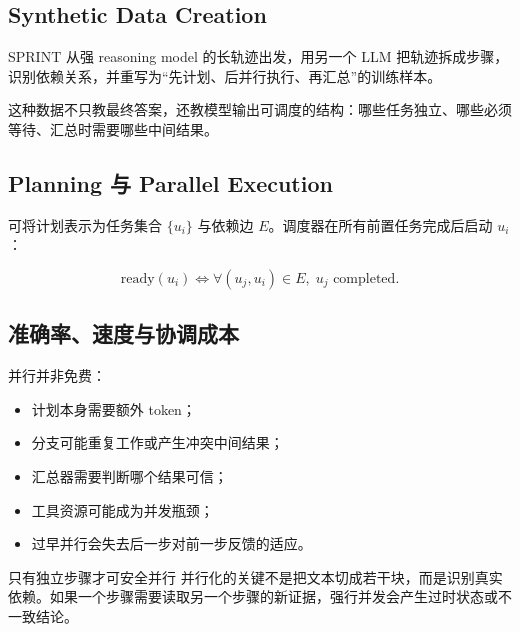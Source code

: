 \documentclass[a4paper]{article}
\begin{document}
\subsection{Synthetic Data Creation}

SPRINT 从强 reasoning model 的长轨迹出发，用另一个 LLM 把轨迹拆成步骤，识别依赖关系，并重写为“先计划、后并行执行、再汇总”的训练样本。


这种数据不只教最终答案，还教模型输出可调度的结构：哪些任务独立、哪些必须等待、汇总时需要哪些中间结果。

\subsection{Planning 与 Parallel Execution}


可将计划表示为任务集合 $\{u_i\}$ 与依赖边 $E$。调度器在所有前置任务完成后启动 $u_i$：

$$
\mathrm{ready}(u_i)\iff \forall (u_j,u_i)\in E,\;u_j\text{ completed}.
$$


\subsection{准确率、速度与协调成本}

并行并非免费：

\begin{itemize}
    \item 计划本身需要额外 token；
    \item 分支可能重复工作或产生冲突中间结果；
    \item 汇总器需要判断哪个结果可信；
    \item 工具资源可能成为并发瓶颈；
    \item 过早并行会失去后一步对前一步反馈的适应。
\end{itemize}

\begin{importantbox}{只有独立步骤才可安全并行}
并行化的关键不是把文本切成若干块，而是识别真实依赖。如果一个步骤需要读取另一个步骤的新证据，强行并发会产生过时状态或不一致结论。
\end{importantbox}
\end{document}
